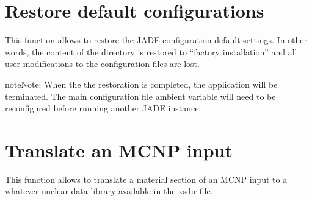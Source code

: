 \documentclass[letterpaper,10pt,english]{sphinxmanual}
\begin{document}
\section{Restore default configurations}
\label{\detokenize{usage/utilities:restore-default-configurations}}
\sphinxAtStartPar
{}

\sphinxAtStartPar
This function allows to restore the JADE configuration default settings.
In other words, the content of the  directory
is restored to “factory installation” and all user modifications to the
configuration files are lost.

\begin{sphinxadmonition}{note}{Note:}
\sphinxAtStartPar
When the the restoration is completed, the application will be terminated.
The main configuration file ambient variable will need to be reconfigured
before running another JADE instance.
\end{sphinxadmonition}


\nopagebreak


\sphinxAtStartPar
{\hyperref[\detokenize{usage/configuration:mainconfig}]{}}




\section{Translate an MCNP input}
\label{\detokenize{usage/utilities:translate-an-mcnp-input}}
\sphinxAtStartPar
{}

\sphinxAtStartPar
This function allows to translate a material section of an MCNP input to
a whatever nuclear data library available in the xsdir file.
\end{document}

